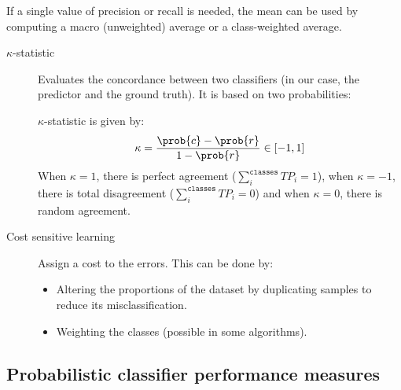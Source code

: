 If a single value of precision or recall is needed, the mean can be used by computing
a macro (unweighted) average or a class-weighted average.

\begin{description}
    \item[$\kappa$-statistic] 
        Evaluates the concordance between two classifiers (in our case, the predictor and the ground truth).
        It is based on two probabilities:

        $\kappa$-statistic is given by:
        \[ \kappa = \frac{\prob{c} - \prob{r}}{1 - \prob{r}} \in [-1, 1] \]
        When $\kappa = 1$, there is perfect agreement ($\sum_{i}^{\texttt{classes}} TP_i = 1$), 
        when $\kappa = -1$, there is total disagreement ($\sum_{i}^{\texttt{classes}} TP_i = 0$) and
        when $\kappa = 0$, there is random agreement.


    \item[Cost sensitive learning] 
        Assign a cost to the errors. This can be done by:
        \begin{itemize}
            \item Altering the proportions of the dataset by duplicating samples to reduce its misclassification.
            \item Weighting the classes (possible in some algorithms).
        \end{itemize}
\end{description}


\subsection{Probabilistic classifier performance measures}

